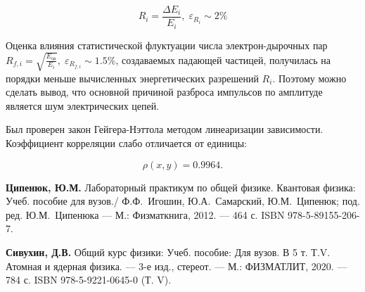 \documentclass[10pt,a4paper]{article}
\newcommand{\MeV}[1][\;]{#1 МэВ}
\newcommand{\msec}[1][\;]{#1 мс}
\renewcommand{\sec}[1][\;]{#1 с}
\renewcommand{\min}[1][\;]{#1 м}
\newcommand{\hour}[1][\;]{#1 ч}
\renewcommand{\day}[1][\;]{#1 д}
\renewcommand{\year}[1][\;]{#1 л}
\newcommand{\stable}[1][\;]{#1 (ст.)}
\begin{document}
\begin{multicols}{2}
	$$R_i = \frac{\Delta E_i}{E_i},\; \varepsilon_{R_i} \sim 2 \%$$
	
	Оценка влияния статистической флуктуации числа электрон-дырочных пар $R_{f,i} = \sqrt{\frac{E_{\text{ср}}}{E_i}}, \; \varepsilon_{R_{f,i}} \sim 1.5 \%$, создаваемых падающей частицей, получилась на порядки меньше вычисленных энергетических разрешений $R_i$. Поэтому можно сделать вывод, что основной причиной разброса импульсов по амплитуде является шум электрических цепей.
	
	Был проверен закон Гейгера-Нэттола методом линеаризации зависимости. Коэффициент корреляции слабо отличается от единицы: 
	
	$$ \rho (x,y) = 0.9964. $$
	
	\begin{thebibliography}{}
		 \textbf{Ципенюк, Ю.М.} Лабораторный практикум по общей физике. Квантовая физика: Учеб. пособие для вузов./ Ф.Ф.~Игошин, Ю.А.~Самарский, Ю.М.~Ципенюк; под. ред. Ю.М.~Ципенюка --- М.: Физматкнига, 2012. --- 464 с. ISBN 978-5-89155-206-7.
		
		 \textbf{Сивухин, Д.В.} Общий курс физики: Учеб. пособие: Для вузов. В 5 т. Т.V. Атомная и ядерная физика. --- 3-е изд., стереот. --- М.: ФИЗМАТЛИТ, 2020. --- 784 с. ISBN 978-5-9221-0645-0 (Т. V).
		

	\end{thebibliography}
	

\end{multicols}
\end{document}
